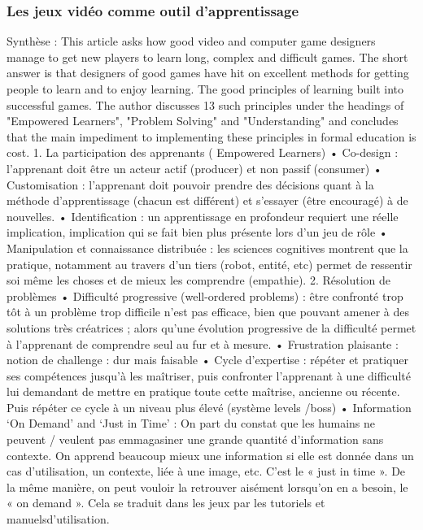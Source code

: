 		\subsubsection*{Les jeux vidéo comme outil d'apprentissage}
Synthèse :
This article asks how good video and computer game designers manage to get new players to learn
long, complex and difficult games. The short answer is that designers of good games have hit on
excellent methods for getting people to learn and to enjoy learning. The good principles of learning
built into successful games. The author discusses 13 such principles under the headings of
"Empowered Learners", "Problem Solving" and "Understanding" and concludes that the main
impediment to implementing these principles in formal education is cost.
1. La participation des apprenants ( Empowered Learners)
• Co-design : l'apprenant doit être un acteur actif (producer) et non passif (consumer)
• Customisation : l'apprenant doit pouvoir prendre des décisions quant à la méthode
d'apprentissage (chacun est différent) et s'essayer (être encouragé) à de nouvelles.
• Identification : un apprentissage en profondeur requiert une réelle implication,
implication qui se fait bien plus présente lors d'un jeu de rôle
• Manipulation et connaissance distribuée : les sciences cognitives montrent que la
pratique, notamment au travers d'un tiers (robot, entité, etc) permet de ressentir soi
même les choses et de mieux les comprendre (empathie).
2. Résolution de problèmes
• Difficulté progressive (well-ordered problems) : être confronté trop tôt à un problème
trop difficile n'est pas efficace, bien que pouvant amener à des solutions très créatrices ;
alors qu'une évolution progressive de la difficulté permet à l'apprenant de comprendre
seul au fur et à mesure.
• Frustration plaisante : notion de challenge : dur mais faisable
• Cycle d'expertise : répéter et pratiquer ses compétences jusqu'à les maîtriser, puis
confronter l'apprenant à une difficulté lui demandant de mettre en pratique toute cette
maîtrise, ancienne ou récente. Puis répéter ce cycle à un niveau plus élevé (système
levels /boss)
• Information ‘On Demand’ and ‘Just in Time’ :
On part du constat que les humains ne peuvent / veulent pas emmagasiner une grande
quantité d'information sans contexte. On apprend beaucoup mieux une information si
elle est donnée dans un cas d'utilisation, un contexte, liée à une image, etc. C'est le « just
in time ». De la même manière, on peut vouloir la retrouver aisément lorsqu'on en a
besoin, le « on demand ». Cela se traduit dans les jeux par les tutoriels et manuelsd'utilisation.
